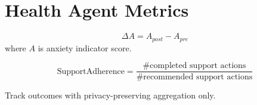 \section*{Health Agent Metrics}

\[
\Delta A = A_{post} - A_{pre}
\]
where $A$ is anxiety indicator score.

\[
\text{SupportAdherence}=\frac{\#\text{completed support actions}}{\#\text{recommended support actions}}
\]

Track outcomes with privacy-preserving aggregation only.
